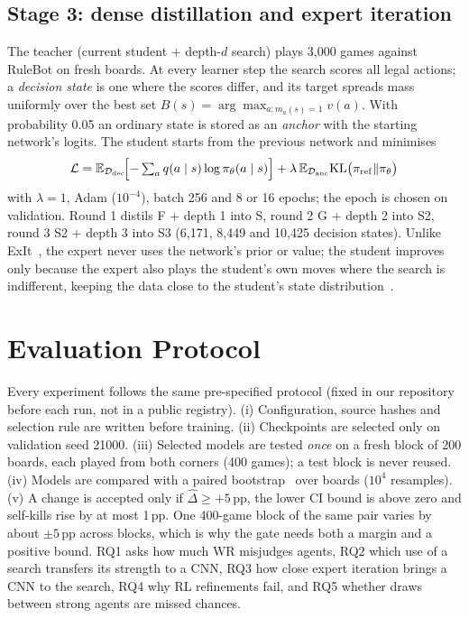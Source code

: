 \documentclass[runningheads]{llncs}
\newcommand{\pp}{\,pp}
\begin{document}
\subsection{Stage 3: dense distillation and expert iteration}
The teacher (current student + depth-$d$ search) plays 3{,}000 games against RuleBot on fresh boards. At every learner step the search scores all legal actions; a \emph{decision state} is one where the scores differ, and its target spreads mass uniformly over the best set $B(s)=\arg\max_{a:m_a(s)=1}v(a)$. With probability 0.05 an ordinary state is stored as an \emph{anchor} with the starting network's logits. The student starts from the previous network and minimises
\begin{equation}
\mathcal{L}=\mathbb{E}_{\mathcal{D}_{\mathrm{dec}}}\!\Bigl[-\textstyle\sum_a q(a\mid s)\log\pi_\theta(a\mid s)\Bigr]+\lambda\,\mathbb{E}_{\mathcal{D}_{\mathrm{anc}}}\mathrm{KL}\bigl(\pi_{\mathrm{ref}}\Vert\pi_\theta\bigr)
\end{equation}
with $\lambda=1$, Adam ($10^{-4}$), batch 256 and 8 or 16 epochs; the epoch is chosen on validation. Round 1 distils F + depth 1 into S, round 2 G + depth 2 into S2, round 3 S2 + depth 3 into S3 (6{,}171, 8{,}449 and 10{,}425 decision states). Unlike ExIt~\cite{anthony2017exit}, the expert never uses the network's prior or value; the student improves only because the expert also plays the student's own moves where the search is indifferent, keeping the data close to the student's state distribution~\cite{ross2011dagger}.

\section{Evaluation Protocol}
\label{sec:protocol}

Every experiment follows the same pre-specified protocol (fixed in our repository before each run, not in a public registry). (i) Configuration, source hashes and selection rule are written before training. (ii) Checkpoints are selected only on validation seed 21000. (iii) Selected models are tested \emph{once} on a fresh block of 200 boards, each played from both corners (400 games); a test block is never reused. (iv) Models are compared with a paired bootstrap~\cite{efron1979bootstrap} over boards ($10^4$ resamples). (v) A change is accepted only if $\hat\Delta\ge+5$\pp{}, the lower CI bound is above zero and self-kills rise by at most 1\pp{}. One 400-game block of the same pair varies by about $\pm5$\pp{} across blocks, which is why the gate needs both a margin and a positive bound. RQ1 asks how much WR misjudges agents, RQ2 which use of a search transfers its strength to a CNN, RQ3 how close expert iteration brings a CNN to the search, RQ4 why RL refinements fail, and RQ5 whether draws between strong agents are missed chances.
\end{document}
